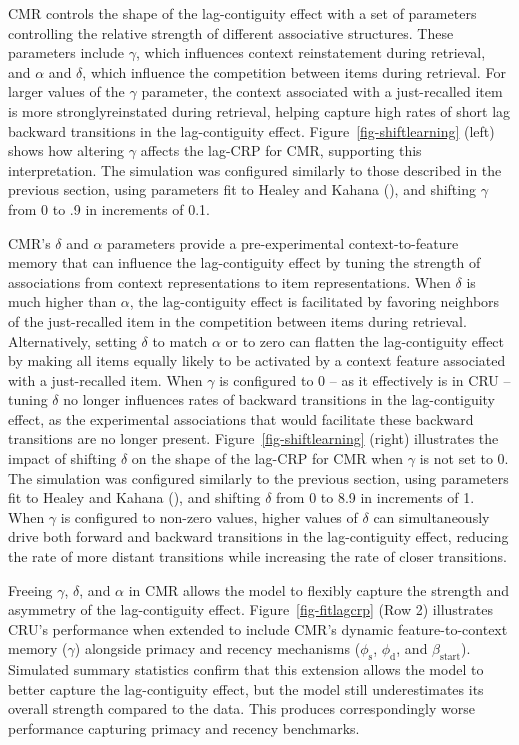 \documentclass[
  man,
  floatsintext,
  longtable,
  nolmodern,
  notxfonts,
  notimes,
  draftfirst,
  colorlinks=true,linkcolor=blue,citecolor=blue,urlcolor=blue]{apa7}
\begin{document}
CMR controls the shape of the lag-contiguity effect with a set of
parameters controlling the relative strength of different associative
structures. These parameters include \(\gamma\), which influences
context reinstatement during retrieval, and \(\alpha\) and \(\delta\),
which influence the competition between items during retrieval. For
larger values of the \(\gamma\) parameter, the context associated with a
just-recalled item is more stronglyreinstated during retrieval, helping
capture high rates of short lag backward transitions in the
lag-contiguity effect. Figure~\ref{fig-shiftlearning} (left) shows how
altering \(\gamma\) affects the lag-CRP for CMR, supporting this
interpretation. The simulation was configured similarly to those
described in the previous section, using parameters fit to Healey and
Kahana (), and shifting \(\gamma\)
from 0 to .9 in increments of 0.1.

CMR's \(\delta\) and \(\alpha\) parameters provide a pre-experimental
context-to-feature memory that can influence the lag-contiguity effect
by tuning the strength of associations from context representations to
item representations. When \(\delta\) is much higher than \(\alpha\),
the lag-contiguity effect is facilitated by favoring neighbors of the
just-recalled item in the competition between items during retrieval.
Alternatively, setting \(\delta\) to match \(\alpha\) or to zero can
flatten the lag-contiguity effect by making all items equally likely to
be activated by a context feature associated with a just-recalled item.
When \(\gamma\) is configured to 0 -- as it effectively is in CRU --
tuning \(\delta\) no longer influences rates of backward transitions in
the lag-contiguity effect, as the experimental associations that would
facilitate these backward transitions are no longer present.
Figure~\ref{fig-shiftlearning} (right) illustrates the impact of
shifting \(\delta\) on the shape of the lag-CRP for CMR when \(\gamma\)
is not set to 0. The simulation was configured similarly to the previous
section, using parameters fit to Healey and Kahana
(), and shifting \(\delta\) from 0
to 8.9 in increments of 1. When \(\gamma\) is configured to non-zero
values, higher values of \(\delta\) can simultaneously drive both
forward and backward transitions in the lag-contiguity effect, reducing
the rate of more distant transitions while increasing the rate of closer
transitions.

Freeing \(\gamma\), \(\delta\), and \(\alpha\) in CMR allows the model
to flexibly capture the strength and asymmetry of the lag-contiguity
effect. Figure~\ref{fig-fitlagcrp} (Row 2) illustrates CRU's performance
when extended to include CMR's dynamic feature-to-context memory
(\(\gamma\)) alongside primacy and recency mechanisms
(\(\phi_\text{s}\), \(\phi_\text{d}\), and \(\beta_\text{start}\)).
Simulated summary statistics confirm that this extension allows the
model to better capture the lag-contiguity effect, but the model still
underestimates its overall strength compared to the data. This produces
correspondingly worse performance capturing primacy and recency
benchmarks.
\end{document}
